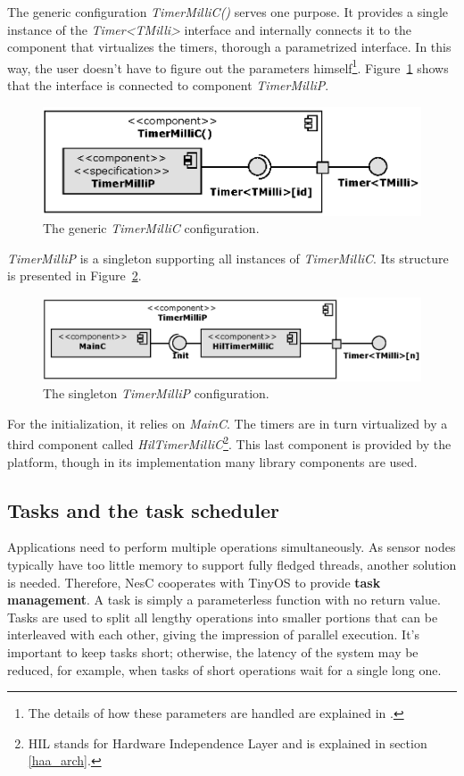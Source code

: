 The generic configuration \emph{TimerMilliC()} serves one purpose. It provides a single instance of the \emph{Timer<TMilli>} interface and internally connects it to the component that virtualizes the timers, thorough a parametrized interface. In this way, the user doesn't have to figure out the parameters himself\footnote{The details of how these parameters are handled are explained in \cite[ch. 6]{TOSProg}.}.  Figure~\ref{fig:timermillic} shows that the interface is connected to component \emph{TimerMilliP}.
\begin{figure}[h]
  \centering
  \includegraphics{diagrams/timermillic.eps}
  \caption{The generic \emph{TimerMilliC} configuration.}
  \label{fig:timermillic}
\end{figure}
\emph{TimerMilliP} is a singleton supporting all instances of \emph{TimerMilliC}. Its structure is presented in Figure~\ref{fig:timermillip}.
\begin{figure}[h]
  \centering
  \includegraphics{diagrams/timermillip.eps}
  \caption{The singleton \emph{TimerMilliP} configuration.}
  \label{fig:timermillip}
\end{figure}
For the initialization, it relies on \emph{MainC}. The timers are in turn virtualized by a third component called \emph{HilTimerMilliC}\footnote{HIL stands for Hardware Independence Layer and is explained in section \ref{haa_arch}.}. This last component is provided by the platform, though in its implementation many library components are used.

\subsection{Tasks and the task scheduler}

Applications need to perform multiple operations simultaneously. As sensor nodes typically have too little memory to support fully fledged threads, another solution is needed. Therefore, NesC cooperates with TinyOS to provide {\bf task management}. A task is simply a parameterless function with no return value. Tasks are used to split all lengthy operations into smaller portions that can be interleaved with each other, giving the impression of parallel execution. It's important to keep tasks short; otherwise, the latency of the system may be reduced, for example, when tasks of short operations wait for a single long one.

